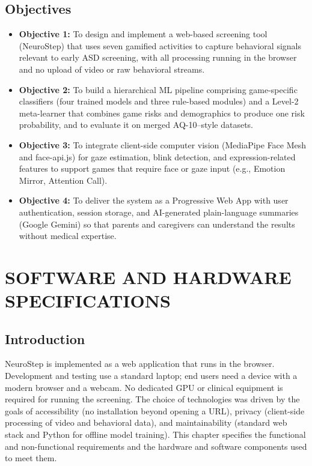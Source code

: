 \documentclass[12pt,a4paper]{report}
\begin{document}
\section{Objectives}
\begin{itemize}
    \item \textbf{Objective 1:} To design and implement a web-based screening tool (NeuroStep) that uses seven gamified activities to capture behavioral signals relevant to early ASD screening, with all processing running in the browser and no upload of video or raw behavioral streams.
    \item \textbf{Objective 2:} To build a hierarchical ML pipeline comprising game-specific classifiers (four trained models and three rule-based modules) and a Level-2 meta-learner that combines game risks and demographics to produce one risk probability, and to evaluate it on merged AQ-10–style datasets.
    \item \textbf{Objective 3:} To integrate client-side computer vision (MediaPipe Face Mesh and face-api.js) for gaze estimation, blink detection, and expression-related features to support games that require face or gaze input (e.g., Emotion Mirror, Attention Call).
    \item \textbf{Objective 4:} To deliver the system as a Progressive Web App with user authentication, session storage, and AI-generated plain-language summaries (Google Gemini) so that parents and caregivers can understand the results without medical expertise.
\end{itemize}
\chapter{SOFTWARE AND HARDWARE SPECIFICATIONS}
\section{Introduction}
NeuroStep is implemented as a web application that runs in the browser. Development and testing use a standard laptop; end users need a device with a modern browser and a webcam. No dedicated GPU or clinical equipment is required for running the screening. The choice of technologies was driven by the goals of accessibility (no installation beyond opening a URL), privacy (client-side processing of video and behavioral data), and maintainability (standard web stack and Python for offline model training). This chapter specifies the functional and non-functional requirements and the hardware and software components used to meet them.
\end{document}
